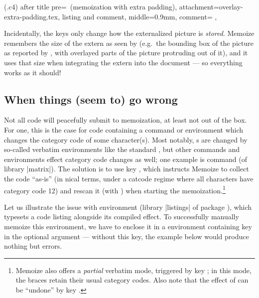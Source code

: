 \documentclass[a4paper,11pt]{article}
\begin{document}
(.c4){
  after title pre={\ (memoization with extra padding)},
  attachment=overlay-extra-padding.tex,
  listing and comment,
  middle=0.9mm,
  comment={\centering
  },
}

\enlargethispage{1ex} %
Incidentally, the  keys only change how
the externalized picture is \emph{stored}.  Memoize remembers the size of the
extern as seen by  (e.g.\ the bounding box of the picture as
reported by \TikZ, with overlayed parts of the picture protruding out of it),
and it uses that size when integrating the extern into the document --- so
everything works as it should!



\subsection{When things (seem to) go wrong}
\label{sec:tut:verbatim}

Not all code will peacefully submit to memoization, at least not out of the
box.  For one, this is the case for code containing a command or environment
which changes the category code of some character(s).  Most notably,
s are changed by so-called verbatim environments like the
standard  , but other commands and environments
effect category code changes as well; one example is command  (of
\TikZ{} library |matrix|).  The solution is to use key
, which instructs Memoize to collect the code ``as-is''
(in nical terms, under a catcode regime where all characters have
category code 12) and rescan it (with ) when starting the
memoization.\footnote{Memoize also offers a \emph{partial} verbatim mode,
  triggered by key ; in this mode, the braces retain their usual
  category codes.  Also note that the effect of  can be
  ``undone'' by key .}

Let us illustrate the issue with environment  (library
|listings| of package ), which typesets a code listing alongside
its compiled effect.  To successfully manually memoize this environment, we
have to enclose it in a  environment containing key
 in the optional argument --- without
this key, the example below would produce nothing but errors.

\end{document}
